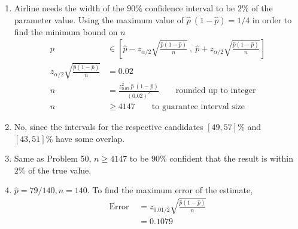 \begin{enumerate}
\begin{subequations}
\begin{enumerate}
			\item $ \widehat{p}  = 0.5106$ \\
			\begin{align}
				p &\in 0.5106 \pm 0.0098 = [0.5008, 0.5204] \qquad \text{95\% confidence}
			\end{align}
		\end{enumerate}
	\end{subequations}

	\item  Airline needs the width of the $ 90\% $ confidence interval to be 2\% of the parameter value. Using the maximum value of $ \widehat{p}\ (1-\widehat{p}) = 1/4 $ in order to find the minimum bound on $ n $\\
	
	\begin{subequations}
		\begin{align}		
			p &\in \left[ \widehat{p} - z_{\alpha/2}\sqrt{\frac{\widehat{p}(1-\widehat{p})}{n}}\ ,\ \widehat{p} + z_{\alpha/2}\sqrt{\frac{\widehat{p}(1-\widehat{p})}{n}}  \right] \nonumber \\
			z_{\alpha/2}\sqrt{\frac{\widehat{p}(1-\widehat{p})}{n}} &= 0.02 \nonumber \\
			n &= \frac{z_{0.05}^2\ \widehat{p}\ (1-\widehat{p})}{(0.02)^2} \qquad \text{rounded up to integer} \nonumber \\
			n &\geq 4147 \qquad \text{to guarantee interval size}
		\end{align}
	\end{subequations}

	\item No, since the intervals for the respective candidates $ [49, 57]\% $ and $ [43, 51]\% $ have some overlap.
	
	\item Same as Problem 50, $ n \geq 4147 $ to be $ 90\% $ confident that the result is within $ 2\% $ of the true value.
	
	\item $ \widehat{p}  = 79/140, n = 140$. To find the maximum error of the estimate,
	\begin{subequations}
		\begin{align}
			\text{Error } &= z_{0.01/2}\sqrt{\frac{\widehat{p}(1-\widehat{p})}{n}} \nonumber \\
			&= 0.1079
		\end{align}
	\end{subequations}


\end{enumerate}

